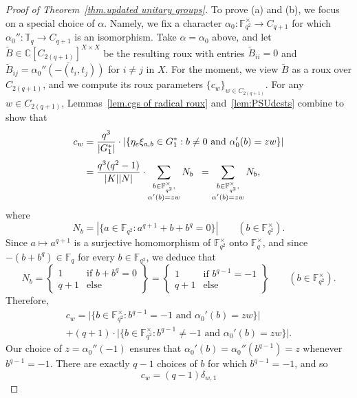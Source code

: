 \documentclass[11pt]{article}
\theoremstyle{definition}
\numberwithin{equation}{section}
\begin{document}
\begin{proof}[Proof of Theorem~\ref{thm.updated unitary groups}]
To prove (a) and (b), we focus on a special choice of $\alpha$.
Namely, we fix a character $\alpha_0 \colon \mathbb{F}_{q^2}^\times \to C_{q+1}$ for which $\alpha_0'' \colon \mathbb{T}_q \to C_{q+1}$ is an isomorphism.
Take $\alpha = \alpha_0$ above, and let $\tilde{B}\in \mathbb{C}[C_{2(q+1)}]^{X \times X}$ be the resulting roux with entries $\tilde{B}_{ii} = 0$ and $\tilde{B}_{ij} =  \overline{\alpha_0''(-(t_i,t_j))}$ for $i \neq j$ in $X$.
For the moment, we view $\tilde{B}$ as a roux over $C_{2(q+1)}$, and we compute its roux parameters $\{c_w\}_{w\in C_{2(q+1)}}$.
For any $w \in C_{2(q+1)}$, Lemmas~\ref{lem.cgs of radical roux} and~\ref{lem:PSUdcsts}
combine to show that 
\begin{align}
\label{eq:PSUcw}
c_w &= \frac{q^3}{|G_1^*|}\cdot  \left| \{ \eta_e \xi_{a,b} \in G_1^* : b\neq 0 \text{ and } \alpha_0'(b) = z w \} \right| \\[3 pt] \notag
&= \frac{q^3(q^2 - 1)}{|K||N|}\cdot \sum_{ \substack{ b \in \mathbb{F}_{q^2}^\times, \\ \alpha'(b) = z w }} N_b
\;\; = \sum_{ \substack{ b \in \mathbb{F}_{q^2}^\times, \\ \alpha'(b) = z w }} N_b,
\end{align}
where 
\[ N_b
=
| \{ a \in \mathbb{F}_{q^2} : a^{q+1} + b + b^q = 0 \} |
\qquad
(b \in \mathbb{F}_{q^2}^\times).
\]
Since $a\mapsto a^{q+1}$ is a surjective homomorphism of $\mathbb{F}_{q^2}^\times$ onto $\mathbb{F}_q^\times$, and since $-(b+b^q)\in\mathbb{F}_q$ for every $b\in\mathbb{F}_{q^2}$, we deduce that
\[
N_b
=\left\{\begin{array}{cl}
1&\text{if }b+b^q=0 \\
q+1&\text{else}
\end{array}\right\}
=\left\{\begin{array}{cl}
1&\text{if }b^{q-1}=-1 \\
q+1&\text{else}
\end{array}\right\}
\qquad
(b \in \mathbb{F}_{q^2}^\times).
\] 
Therefore,
\begin{multline*}
c_w
=\Big|\Big\{b\in\mathbb{F}_{q^2}^\times:b^{q-1}=-1\text{ and }\alpha_0'(b)=zw\Big\}\Big| \\
+(q+1) \cdot \Big|\Big\{b\in\mathbb{F}_{q^2}^\times:b^{q-1}\neq-1\text{ and }\alpha_0'(b)=zw\Big\}\Big|.
\end{multline*}
Our choice of $z=\alpha_0''(-1)$ ensures that $\alpha_0'(b)=\alpha_0''(b^{q-1})=z$ whenever $b^{q-1}=-1$.
There are exactly $q-1$ choices of $b$ for which $b^{q-1}=-1$, and so 
\[
c_w
=(q-1)\delta_{w,1}
\]
\end{proof}
\end{document}
